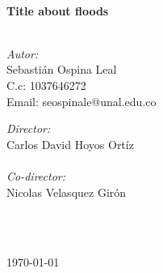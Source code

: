 \documentclass[10pt]{article}
\begin{document}
\begin{center}
 			\vspace*{1cm}																		%
\HRule \\[0.4cm]																	%
{ \huge \bfseries Title about floods}\\[0.4cm]	%
\HRule \\[1.5cm]																	%
\begin{minipage}{0.46\textwidth}													%
\begin{flushleft} \large															%
\emph{Autor:}\\	
Sebastián Ospina Leal\\
C.c: 1037646272\\ 
Email: seospinale@unal.edu.co
\end{flushleft}																		%
\end{minipage}		
\begin{minipage}{0.52\textwidth}		
\vspace{-0.6cm}											%
\begin{flushright} \large															%
\emph{Director:} \\																	%
Carlos David Hoyos Ortíz\\
 	\\
\emph{Co-director:} \\																	%
Nicolas Velasquez Girón\\
 \\
\end{flushright}																	%
\end{minipage}	
\vspace*{1cm}
 	
 		\\																		%
\vspace{2cm} 																				
\begin{center}																					
{\large \today}																	%
 			\end{center}												  						
\end{center}							 											
																					
\newpage																		
\end{document}
